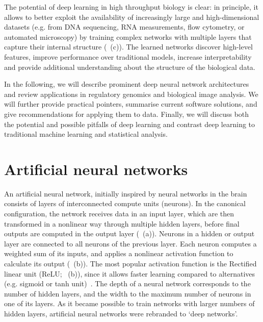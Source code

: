 The potential of deep learning in high throughput biology is clear: in principle, it allows to better exploit the availability of increasingly large and high-dimensional datasets (e.g. from DNA sequencing, RNA measurements, flow cytometry, or automated microscopy) by training complex networks with multiple layers that capture their internal structure (~(c)). The learned networks discover high-level features, improve performance over traditional models, increase interpretability and provide additional understanding about the structure of the biological data.

In the following, we will describe prominent deep neural network architectures and review applications in regulatory genomics and biological image analysis. We will further provide practical pointers, summarise current software solutions, and give recommendations for applying them to data. Finally, we will discuss both the potential and possible pitfalls of deep learning and contrast deep learning to traditional machine learning and statistical analysis.


\section{Artificial neural networks}

An artificial neural network, initially inspired by neural networks in the brain~\citep{farley_simulation_1954,mcculloch_logical_1943,rosenblatt_perceptron:_1958} consists of layers of interconnected compute units (neurons). In the canonical configuration, the network receives data in an input layer, which are then transformed in a nonlinear way through multiple hidden layers, before final outputs are computed in the output layer (~(a)). Neurons in a hidden or output layer are connected to all neurons of the previous layer. Each neuron computes a weighted sum of its inputs, and applies a nonlinear activation function to calculate its output (~(b)). The most popular activation function is the Rectified linear unit (ReLU; ~(b)), since it allows faster learning compared to alternatives (e.g. sigmoid or tanh unit)~\citep{glorot_deep_2011}. The depth of a neural network corresponds to the number of hidden layers, and the width to the maximum number of neurons in one of its layers. As it became possible to train networks with larger numbers of hidden layers, artificial neural networks were rebranded to `deep networks'.

